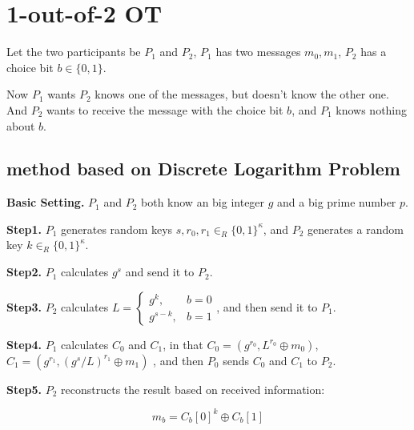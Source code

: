 \documentclass{article}
\begin{document}
\section{1-out-of-2 OT}

\par Let the two participants be $P_1$ and $P_2$, $P_1$ has two messages $m_0, m_1$, $P_2$
has a choice bit $b\in \{ 0,1 \}$.

\par Now $P_1$ wants $P_2$ knows one of the messages, but doesn't know the other one.
And $P_2$ wants to receive the message with the choice bit $b$, and $P_1$ knows nothing
about $b$.

\subsection{method based on \textbf{Discrete Logarithm Problem}}

\par \textbf{Basic Setting.} $P_1$ and $P_2$ both know an big integer $g$ and
a big prime number $p$.

\par \textbf{Step1.} $P_1$ generates random keys $s, r_0, r_1 \in_R \{0,1\}^\kappa$,
and $P_2$ generates a random key $k \in_R \{0,1\}^\kappa$.

\par \textbf{Step2.} $P_1$ calculates $g^s$ and send it to $P_2$.

\par \textbf{Step3.} $P_2$ calculates $L=
    \left\{
        \begin{aligned}
            g^k, & b=0 \\
            g^{s-k}, & b=1
        \end{aligned}
    \right.$, and then send it to $P_1$.

\par \textbf{Step4.} $P_1$ calculates $C_0$ and $C_1$, in that
$C_0 = (g^{r_0}, L^{r_0}\oplus m_0)$, $C_1 = (g^{r_1}, ({g^s}/L)^{r_1}\oplus m_1)$
, and then $P_0$ sends $C_0$ and $C_1$ to $P_2$.

\par \textbf{Step5.} $P_2$ reconstructs the result based on received information:

\begin{equation}
    m_b={C_b[0]}^k\oplus C_b[1]
\end{equation}

 
\end{document}
